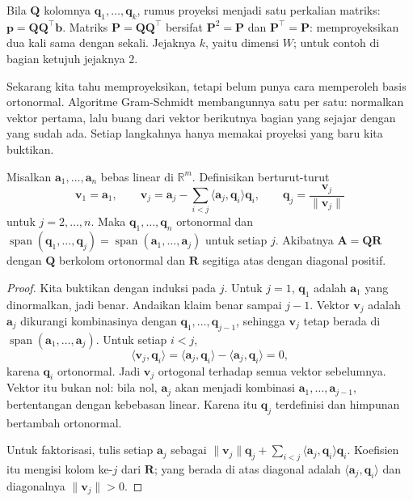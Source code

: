 Bila $\mathbf{Q}$ kolomnya $\mathbf{q}_{1},\dots,\mathbf{q}_{k}$, rumus proyeksi menjadi
satu perkalian matriks: $\mathbf{p}=\mathbf{Q}\mathbf{Q}^{\top}\mathbf{b}$. Matriks
$\mathbf{P}=\mathbf{Q}\mathbf{Q}^{\top}$ bersifat $\mathbf{P}^{2}=\mathbf{P}$ dan
$\mathbf{P}^{\top}=\mathbf{P}$: memproyeksikan dua kali sama dengan sekali. Jejaknya $k$,
yaitu dimensi $W$; untuk contoh di bagian ketujuh jejaknya $2$.

Sekarang kita tahu memproyeksikan, tetapi belum punya cara memperoleh basis ortonormal.
Algoritme Gram-Schmidt membangunnya satu per satu: normalkan vektor pertama, lalu buang
dari vektor berikutnya bagian yang sejajar dengan yang sudah ada. Setiap langkahnya
hanya memakai proyeksi yang baru kita buktikan.

\begin{teorema}
Misalkan $\mathbf{a}_{1},\dots,\mathbf{a}_{n}$ bebas linear di $\mathbb{R}^{m}$.
Definisikan berturut-turut
\[
  \mathbf{v}_{1}=\mathbf{a}_{1},\qquad
  \mathbf{v}_{j}=\mathbf{a}_{j}-\sum_{i<j}\langle\mathbf{a}_{j},\mathbf{q}_{i}\rangle\mathbf{q}_{i},
  \qquad
  \mathbf{q}_{j}=\frac{\mathbf{v}_{j}}{\|\mathbf{v}_{j}\|}
\]
untuk $j=2,\dots,n$. Maka $\mathbf{q}_{1},\dots,\mathbf{q}_{n}$ ortonormal dan
$\operatorname{span}(\mathbf{q}_{1},\dots,\mathbf{q}_{j})
=\operatorname{span}(\mathbf{a}_{1},\dots,\mathbf{a}_{j})$ untuk setiap $j$. Akibatnya
$\mathbf{A}=\mathbf{Q}\mathbf{R}$ dengan $\mathbf{Q}$ berkolom ortonormal dan
$\mathbf{R}$ segitiga atas dengan diagonal positif.
\end{teorema}

\begin{proof}
Kita buktikan dengan induksi pada $j$. Untuk $j=1$, $\mathbf{q}_{1}$ adalah
$\mathbf{a}_{1}$ yang dinormalkan, jadi benar. Andaikan klaim benar sampai $j-1$.
Vektor $\mathbf{v}_{j}$ adalah $\mathbf{a}_{j}$ dikurangi kombinasinya dengan
$\mathbf{q}_{1},\dots,\mathbf{q}_{j-1}$, sehingga $\mathbf{v}_{j}$ tetap berada di
$\operatorname{span}(\mathbf{a}_{1},\dots,\mathbf{a}_{j})$. Untuk setiap $i<j$,
\[
  \langle\mathbf{v}_{j},\mathbf{q}_{i}\rangle
  =\langle\mathbf{a}_{j},\mathbf{q}_{i}\rangle-\langle\mathbf{a}_{j},\mathbf{q}_{i}\rangle=0,
\]
karena $\mathbf{q}_{i}$ ortonormal. Jadi $\mathbf{v}_{j}$ ortogonal terhadap semua
vektor sebelumnya. Vektor itu bukan nol: bila nol, $\mathbf{a}_{j}$ akan menjadi
kombinasi $\mathbf{a}_{1},\dots,\mathbf{a}_{j-1}$, bertentangan dengan kebebasan linear.
Karena itu $\mathbf{q}_{j}$ terdefinisi dan himpunan bertambah ortonormal.

Untuk faktorisasi, tulis setiap $\mathbf{a}_{j}$ sebagai
$\|\mathbf{v}_{j}\|\mathbf{q}_{j}+\sum_{i<j}\langle\mathbf{a}_{j},\mathbf{q}_{i}\rangle\mathbf{q}_{i}$.
Koefisien itu mengisi kolom ke-$j$ dari $\mathbf{R}$; yang berada di atas diagonal adalah
$\langle\mathbf{a}_{j},\mathbf{q}_{i}\rangle$ dan diagonalnya $\|\mathbf{v}_{j}\|>0$.
\end{proof}

